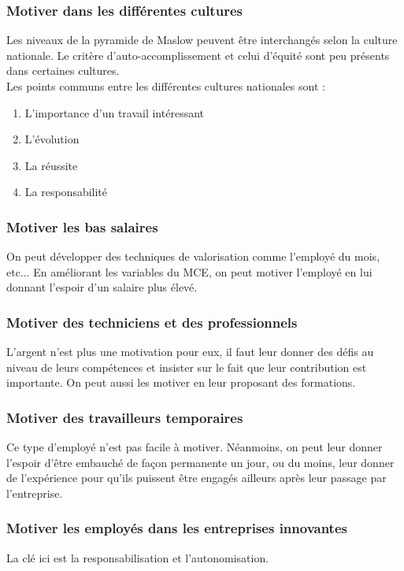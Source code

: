 \documentclass[letterpaper, 12pt]{article}
\newcommand{\alinea}{
\hspace*{0.3cm}}
\begin{document}
		\subsubsection{Motiver dans les différentes cultures}
			\alinea Les niveaux de la pyramide de Maslow peuvent être interchangés selon la culture nationale.
				Le critère d'auto-accomplissement et celui d'équité sont peu présents dans certaines cultures.
			\\\alinea Les points communs entre les différentes cultures nationales sont : 
				\begin{enumerate}
					\setlength{\itemsep}{0pt}
					\setlength{\parskip}{0pt}
					\setlength{\parsep}{0pt}
					\item L'importance d'un travail intéressant
					\item L'évolution
					\item La réussite
					\item La responsabilité
				\end{enumerate}
		\subsubsection{Motiver les bas salaires}
			\alinea On peut développer des techniques de valorisation comme l'employé du mois, etc...
			En améliorant les variables du MCE, on peut motiver l'employé en lui donnant l'espoir d'un
			salaire plus élevé.
		\subsubsection{Motiver des techniciens et des professionnels}
			\alinea L'argent n'est plus une motivation pour eux, il faut leur donner des défis au niveau
			de leurs compétences et insister sur le fait que leur contribution est importante. On
			peut aussi les motiver en leur proposant des formations.
		\subsubsection{Motiver des travailleurs temporaires}
			\alinea Ce type d'employé n'est pas facile à motiver. Néanmoins, on peut leur donner 
			l'espoir d'être embauché de façon permanente un jour, ou du moins, leur 
			donner de l'expérience pour qu'ils puissent être engagés ailleurs après leur passage par 
			l'entreprise.
		\subsubsection{Motiver les employés dans les entreprises innovantes}
			\alinea La clé ici est la responsabilisation et l'autonomisation.
\pagebreak
\end{document}
